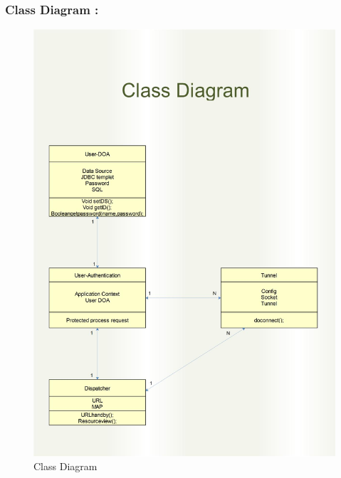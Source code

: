 \documentclass[12pt,a4paper,final,oneside]{report}
\begin{document}
\subsubsection{Class Diagram :}
\begin{figure}
\centering
\includegraphics[totalheight=0.5\textheight,angle=0]		{Class.jpg}
		\caption{Class Diagram}
\end{figure}
\end{document}
